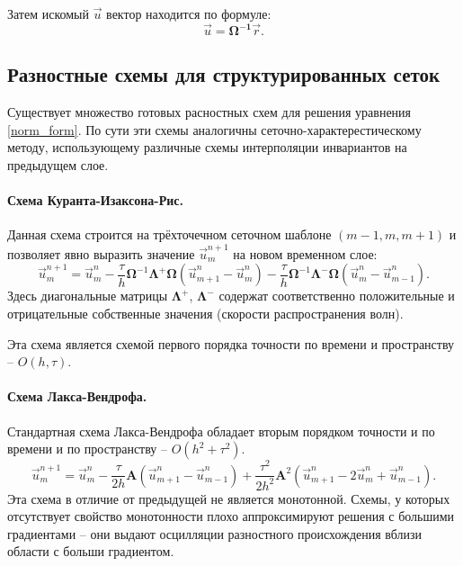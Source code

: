 	Затем искомый $\vec{u}$ вектор находится по формуле:
\begin{equation}
	\vec{u} = \mathbf{\Omega^{-1}}\vec{r}.
\end{equation}	

\subsection{Разностные схемы для структурированных сеток}
	
	Существует множество готовых расностных схем для решения уравнения \eqref{norm_form}.
	По сути эти схемы аналогичны сеточно-характерестическому методу, использующему различные схемы интерполяции инвариантов на предыдущем слое.
	
\paragraph{Схема Куранта-Изаксона-Рис.} Данная схема строится на трёхточечном сеточном шаблоне $(m-1, m, m+1)$ и позволяет явно выразить значение $\vec{u}_m^{n+1}$ на новом временном слое:
\begin{equation}
	\label{CIR scheme}
	\vec{u}^{n+1}_m = \vec{u}^n_m - \frac{\tau}{h} \mathbf{\Omega}^{-1} \mathbf{\Lambda}^+ \mathbf{\Omega} (\vec{u}^n_{m+1} - \vec{u}^n_m) 
	- \frac{\tau}{h} \mathbf{\Omega}^{-1} \mathbf{\Lambda}^- \mathbf{\Omega} (\vec{u}^n_m - \vec{u}^n_{m-1}) .
\end{equation}
	Здесь диагональные матрицы $\mathbf{\Lambda}^+$, $\mathbf{\Lambda}^-$ содержат соответственно положительные и отрицательные собственные значения (скорости распространения волн).
	
	Эта схема является схемой первого порядка точности по времени и пространству -- $O(h, \tau)$.
	
\paragraph{Схема Лакса-Вендрофа.} Стандартная схема Лакса-Вендрофа обладает вторым порядком точности и по времени и по пространству -- $O(h^2 + \tau^2)$.
\begin{equation}
	\label{LW scheme}
	\vec{u}^{n+1}_m = \vec{u}^n_m - \frac{\tau}{2h} \mathbf{A} (\vec{u}^n_{m+1} - \vec{u}^n_{m-1})
	 + \frac{\tau^2}{2h^2} \mathbf{A}^2 (\vec{u}^n_{m+1} - 2\vec{u}^n_m + \vec{u}^n_{m-1}) .
\end{equation}
	Эта схема в отличие от предыдущей не является монотонной. 
	Схемы, у которых отсутствует свойство монотонности плохо аппроксимируют решения с большими градиентами -- они выдают осцилляции разностного происхождения вблизи области с больши градиентом.
	
